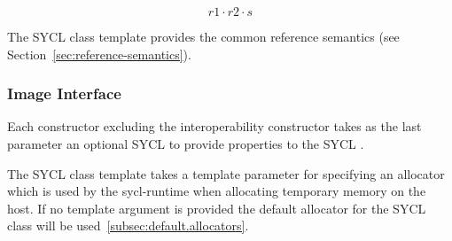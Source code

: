 \begin{equation}
\label{image-slice-pitch}
 r1 \cdot r2 \cdot s
\end{equation}

The SYCL  class template provides the common reference
semantics (see Section~\ref{sec:reference-semantics}).

\subsubsection{Image Interface}

Each constructor excluding the interoperability constructor takes as the last parameter an optional SYCL  to provide properties to the SYCL .

The SYCL  class template takes a template parameter  for specifying an allocator which is used by the \gls{sycl-runtime} when allocating temporary memory on the host. If no template argument is provided the default allocator for the SYCL  class  will be used~\ref{subsec:default.allocators}.


